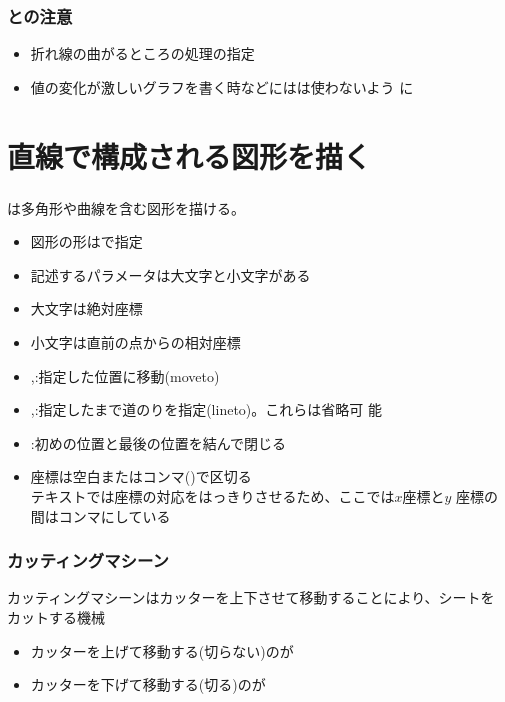 \begin{frame}[containsverbatim]
 \frametitle{との注意}
 \begin{itemize}
  \item 折れ線の曲がるところの処理の指定
  \item 値の変化が激しいグラフを書く時などにはは使わないよう
        に
 \end{itemize}
\end{frame}
\section{直線で構成される図形を描く}
\begin{frame}[containsverbatim]
 \frametitle{}
 は多角形や曲線を含む図形を描ける。

\begin{itemize}
 \item 図形の形はで指定
 \item 記述するパラメータは大文字と小文字がある
 \item 大文字は絶対座標
 \item 小文字は直前の点からの相対座標
 \item {},:指定した位置に移動(moveto)
 \item {},:指定したまで道のりを指定(lineto)。これらは省略可
       能
 \item {}:初めの位置と最後の位置を結んで閉じる
 \item 座標は空白またはコンマ(\VAL{,})で区切る\\
       テキストでは座標の対応をはっきりさせるため、ここでは$x$座標と$y$
       座標の間はコンマにしている
\end{itemize}
\end{frame}
\iffalse
\begin{frame}[containsverbatim]
 \frametitle{プロッター}
 平面に置かれた紙などに図形を描く機材(\texttt{http://www.i-cadcam.jp/plotter.html})
 \FIGN{0.6}{large-scale-plotter}
\end{frame}
\fi
\iffalse
\begin{frame}[containsverbatim]
 \frametitle{カッティングマシーン}
 カッティングマシーンはカッターを上下させて移動することにより、シートを
 カットする機械
 \begin{itemize}
  \item カッターを上げて移動する(切らない)のが
  \item カッターを下げて移動する(切る)のが
 \end{itemize}
\end{frame}
